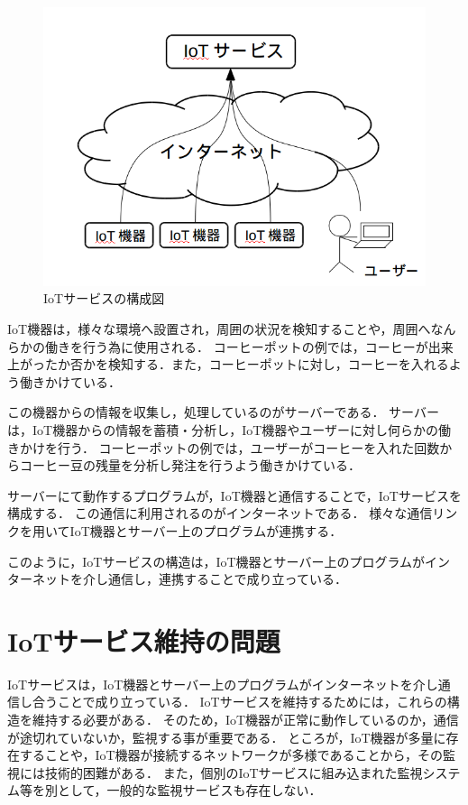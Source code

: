 \begin{figure}[htbp]
\includegraphics[width=16cm]{images/IoTservice.png}
\caption{IoTサービスの構成図}
\label{fig:IoTservice}
\end{figure}

IoT機器は，様々な環境へ設置され，周囲の状況を検知することや，周囲へなんらかの働きを行う為に使用される．
コーヒーポットの例では，コーヒーが出来上がったか否かを検知する．また，コーヒーポットに対し，コーヒーを入れるよう働きかけている．
\medskip

この機器からの情報を収集し，処理しているのがサーバーである．
サーバーは，IoT機器からの情報を蓄積・分析し，IoT機器やユーザーに対し何らかの働きかけを行う．
コーヒーポットの例では，ユーザーがコーヒーを入れた回数からコーヒー豆の残量を分析し発注を行うよう働きかけている．
\medskip

サーバーにて動作するプログラムが，IoT機器と通信することで，IoTサービスを構成する．
この通信に利用されるのがインターネットである．
様々な通信リンクを用いてIoT機器とサーバー上のプログラムが連携する．
\medskip

このように，IoTサービスの構造は，IoT機器とサーバー上のプログラムがインターネットを介し通信し，連携することで成り立っている．

\section{IoTサービス維持の問題}
IoTサービスは，IoT機器とサーバー上のプログラムがインターネットを介し通信し合うことで成り立っている．
IoTサービスを維持するためには，これらの構造を維持する必要がある．
そのため，IoT機器が正常に動作しているのか，通信が途切れていないか，監視する事が重要である．
ところが，IoT機器が多量に存在することや，IoT機器が接続するネットワークが多様であることから，その監視には技術的困難がある．
また，個別のIoTサービスに組み込まれた監視システム等を別として，一般的な監視サービスも存在しない．
\medskip

